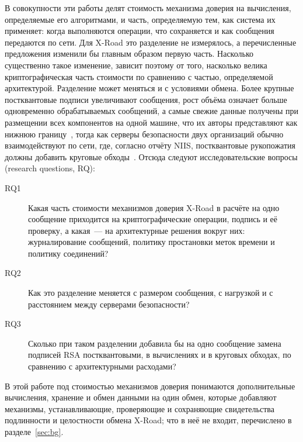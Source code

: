 \documentclass[conference,a4paper]{IEEEtran}
\newcommand{\newred}[1]{{\color{red}#1}}
\begin{document}
{В совокупности эти работы делят стоимость механизма доверия на вычисления, определяемые его
алгоритмами, и часть, определяемую тем, как система их применяет: когда выполняются операции, что
сохраняется и как сообщения передаются по сети. Для X-Road это разделение не измерялось, а
перечисленные предложения изменили бы главным образом первую часть. Насколько существенно такое
изменение, зависит поэтому от того, насколько велика криптографическая часть стоимости по сравнению с
частью, определяемой архитектурой. Разделение может меняться и с условиями обмена. Более крупные
постквантовые подписи увеличивают сообщения, рост объёма означает больше одновременно обрабатываемых
сообщений, а самые свежие данные получены при размещении всех компонентов на одной машине, что их
авторы представляют как нижнюю границу~\cite{bakhtina2026ijis}, тогда как серверы безопасности двух
организаций обычно взаимодействуют по сети, где, согласно отчёту NIIS, постквантовые рукопожатия
должны добавить круговые обходы~\cite{bakhtina2026pqc}. Отсюда следуют исследовательские вопросы
(research questions, RQ):

\begin{description}
  \item[RQ1] Какая часть стоимости механизмов доверия X-Road в расчёте на одно сообщение приходится
  на криптографические операции, подпись и её проверку, а какая~--- на архитектурные решения
  вокруг них: журналирование сообщений, политику простановки меток времени и политику соединений?
  \item[RQ2] Как это разделение меняется с размером сообщения, с нагрузкой и с расстоянием между
  серверами безопасности?
  \item[RQ3] Сколько при таком разделении добавила бы на одно сообщение замена подписей RSA
  постквантовыми, в вычислениях и в круговых обходах, по сравнению с архитектурными расходами?
\end{description}

\newred{В этой работе под стоимостью механизмов доверия понимаются дополнительные вычисления, хранение
и обмен данными на один обмен, которые добавляют механизмы, устанавливающие, проверяющие и сохраняющие
свидетельства подлинности и целостности обмена X-Road; что в неё не входит, перечислено в
разделе~\ref{sec:bg}.}

}
\end{document}
